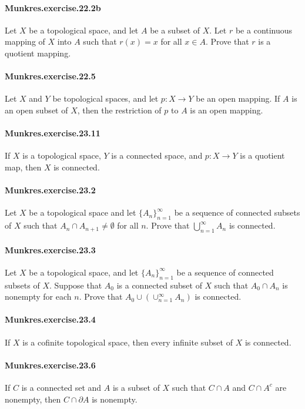 \documentclass{article}
\begin{document}
\paragraph{Munkres.exercise.22.2b} Let $X$ be a topological space, and let $A$ be a subset of $X$. Let $r$ be a continuous mapping of $X$ into $A$ such that $r(x)=x$ for all $x \in A$. Prove that $r$ is a quotient mapping.

\paragraph{Munkres.exercise.22.5} Let $X$ and $Y$ be topological spaces, and let $p:X\to Y$ be an open mapping. If $A$ is an open subset of $X$, then the restriction of $p$ to $A$ is an open mapping.

\paragraph{Munkres.exercise.23.11} If $X$ is a topological space, $Y$ is a connected space, and $p:X\to Y$ is a quotient map, then $X$ is connected.

\paragraph{Munkres.exercise.23.2} Let $X$ be a topological space and let $\{A_n\}_{n=1}^\infty$ be a sequence of connected subsets of $X$ such that $A_n\cap A_{n+1}\neq\emptyset$ for all $n$. Prove that $\bigcup_{n=1}^\infty A_n$ is connected.

\paragraph{Munkres.exercise.23.3} Let $X$ be a topological space, and let $\{A_n\}_{n=1}^\infty$ be a sequence of connected subsets of $X$. Suppose that $A_0$ is a connected subset of $X$ such that $A_0\cap A_n$ is nonempty for each $n$. Prove that $A_0\cup (\cup_{n=1}^\infty A_n)$ is connected.

\paragraph{Munkres.exercise.23.4} If $X$ is a cofinite topological space, then every infinite subset of $X$ is connected.

\paragraph{Munkres.exercise.23.6} If $C$ is a connected set and $A$ is a subset of $X$ such that $C\cap A$ and $C\cap A^c$ are nonempty, then $C\cap \partial A$ is nonempty.
\end{document}
